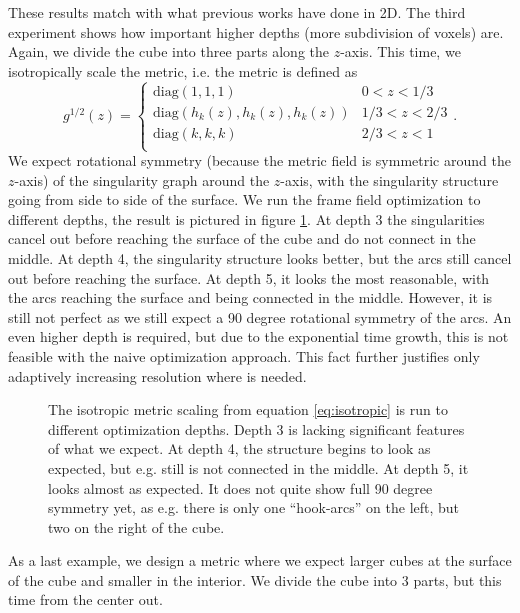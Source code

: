 \documentclass[../thesis.tex]{subfiles}
\begin{document}
These results match with what previous works have done in 2D.
The third experiment shows how important higher depths (more subdivision of voxels) are.
Again, we divide the cube into three parts along the $z$-axis.
This time, we isotropically scale the metric, i.e. the metric is defined as
\begin{equation}\label{eq:isotropic} 
g^{1/2}(z) = \begin{cases}
    \mathrm{diag}(1,1,1) &0 < z < 1/3 \\
    \mathrm{diag}(h_k(z), h_k(z), h_k(z)) &1/3 < z < 2/3 \\
    \mathrm{diag}(k,k,k) &2/3 < z < 1 \\
\end{cases}.\end{equation}
We expect rotational symmetry (because the metric field is symmetric around the $z$-axis) of the singularity graph around the $z$-axis,
with the singularity structure going from side to side of the surface. We run the frame field optimization to different
depths, the result is pictured in figure \ref{fig:isotropic}. At depth 3 the singularities
cancel out before reaching the surface of the cube and do not connect in the middle. At depth 4, the singularity structure
looks better, but the arcs still cancel out before reaching the surface. At depth 5, it looks
the most reasonable, with the arcs reaching the surface and being connected in the middle.
However, it is still not perfect as we still expect a 90 degree rotational symmetry of the arcs.
An even higher depth is required, but due to the exponential time growth, this is not feasible
with the naive optimization approach. This fact further justifies only adaptively increasing resolution where is needed.
\begin{figure}[htb]
    \centering
    \def\svgwidth{\textwidth}
    
    \caption{The isotropic metric scaling from equation \ref{eq:isotropic} is run to different optimization depths.
    Depth 3 is lacking significant features of what we expect. At depth 4, the structure begins to look as expected, but e.g. still is not connected in the middle.
    At depth 5, it looks almost as expected. It does not quite show full 90 degree symmetry yet, as e.g. there is only one ``hook-arcs'' on the left, but two on the right of the cube.}
    \label{fig:isotropic}
\end{figure}
As a last example, we design a metric where we expect larger cubes at the surface of the cube and smaller in the interior.
We divide the cube into 3 parts, but this time from the center out.
\end{document}
